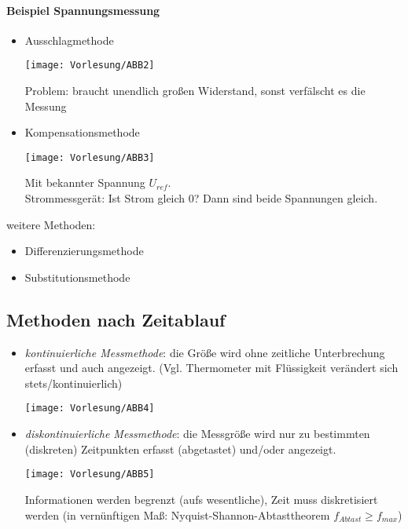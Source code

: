 \documentclass{scrreprt}
\begin{document}
\paragraph{Beispiel Spannungsmessung}
\begin{itemize}
\item Ausschlagmethode
\begin{center}
\texttt{[image: Vorlesung/ABB2]}
\end{center}
Problem: braucht unendlich großen Widerstand, sonst verfälscht es die Messung
\item Kompensationsmethode
\begin{center}
\texttt{[image: Vorlesung/ABB3]}
\end{center}
Mit bekannter Spannung $U_{ref}$.\\
Strommessgerät: Ist Strom gleich 0? Dann sind beide Spannungen gleich.
\end{itemize}
weitere Methoden:
\begin{itemize}
\item Differenzierungsmethode
\item Substitutionsmethode
\end{itemize}

\subsection{Methoden nach Zeitablauf}
\begin{itemize}
\item \emph{kontinuierliche Messmethode}: die Größe wird ohne zeitliche Unterbrechung erfasst und auch angezeigt. (Vgl. Thermometer mit Flüssigkeit verändert sich stets/kontinuierlich)
\begin{center}
\texttt{[image: Vorlesung/ABB4]}
\end{center}
\item \emph{diskontinuierliche Messmethode}: die Messgröße wird nur zu bestimmten (diskreten) Zeitpunkten erfasst (abgetastet) und/oder angezeigt.
\begin{center}
\texttt{[image: Vorlesung/ABB5]}
\end{center}
Informationen werden begrenzt (aufs wesentliche), Zeit muss diskretisiert werden (in vernünftigen Maß: Nyquist-Shannon-Abtasttheorem $f_{Abtast}\geq f_{max}$)
\end{itemize}
\end{document}
